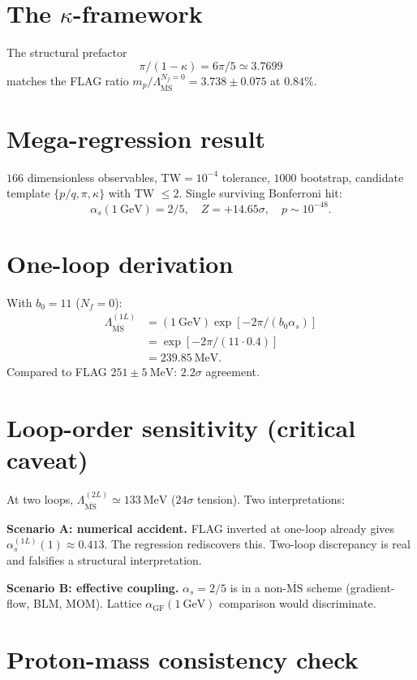 \documentclass[aps,prl,reprint,superscriptaddress,floatfix,nofootinbib,amssymb]{revtex4-2}
\newcommand{\msb}{\overline{\mathrm{MS}}}
\newcommand{\Lqcd}{\Lambda_{\msb}}
\newcommand{\alphas}{\alpha_{s}}
\newcommand{\Nf}{N_{f}}
\newcommand{\bzero}{b_{0}}
\newcommand{\kap}{\kappa}
\begin{document}
\section{The $\kap$-framework}
The structural prefactor
\begin{equation}
\pi/(1-\kap) = 6\pi/5 \simeq 3.7699
\end{equation}
matches the FLAG ratio $m_p/\Lqcd^{\Nf=0} = 3.738 \pm 0.075$ at $0.84\%$.

\section{Mega-regression result}
$166$ dimensionless observables, $\mathrm{TW} = 10^{-4}$ tolerance, $1000$ bootstrap, candidate template $\{p/q, \pi, \kap\}$ with TW $\leq 2$. Single surviving Bonferroni hit:
\begin{equation}
\alphas(1~\mathrm{GeV}) = 2/5, \quad Z = +14.65\sigma, \quad p \sim 10^{-48}.
\end{equation}

\section{One-loop derivation}
With $\bzero = 11$ ($\Nf=0$):
\begin{align}
\Lqcd^{(1L)} &= (1~\mathrm{GeV}) \exp[-2\pi/(\bzero \alphas)] \\
             &= \exp[-2\pi/(11 \cdot 0.4)] \\
             &= 239.85~\mathrm{MeV}.
\end{align}
Compared to FLAG $251 \pm 5~\mathrm{MeV}$: $2.2\sigma$ agreement.

\section{Loop-order sensitivity (critical caveat)}
At two loops, $\Lqcd^{(2L)} \simeq 133~\mathrm{MeV}$ ($24\sigma$ tension). Two interpretations:

\textbf{Scenario A: numerical accident.} FLAG inverted at one-loop already gives $\alphas^{(1L)}(1) \approx 0.413$. The regression rediscovers this. Two-loop discrepancy is real and falsifies a structural interpretation.

\textbf{Scenario B: effective coupling.} $\alphas = 2/5$ is in a non-$\msb$ scheme (gradient-flow, BLM, MOM). Lattice $\alpha_{\mathrm{GF}}(1~\mathrm{GeV})$ comparison would discriminate.

\section{Proton-mass consistency check}
\end{document}
